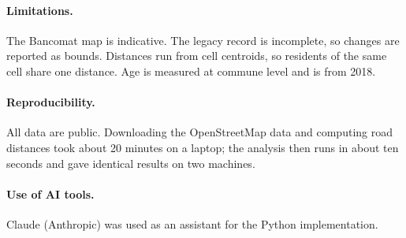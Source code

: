 \documentclass[11pt]{article}
\begin{document}
\paragraph{Limitations.} The Bancomat map is indicative. The legacy record is incomplete, so changes are reported as bounds. Distances run from cell centroids, so residents of the same cell share one distance. Age is measured at commune level and is from 2018.

\paragraph{Reproducibility.} All data are public. Downloading the OpenStreetMap data and computing road distances took about 20 minutes on a laptop; the analysis then runs in about ten seconds and gave identical results on two machines.

\paragraph{Use of AI tools.} Claude (Anthropic) was used as an assistant for the Python implementation.
\end{document}

